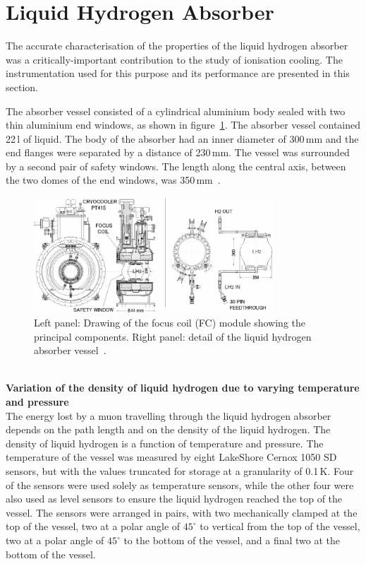 \graphicspath{{07-Absorber/Figures/}}

\section{Liquid Hydrogen Absorber}
\label{Sect:Absorber}

The accurate characterisation of the properties of the liquid hydrogen
absorber was a critically-important contribution to the study of
ionisation cooling.
The instrumentation used for this purpose and its performance are
presented in this section.

The absorber vessel consisted of a cylindrical aluminium body sealed
with two thin aluminium end windows, as shown in
figure~\ref{Fig:AbsorberVessel:Diag}.
The absorber vessel contained 22\,l of liquid.
The body of the absorber had an inner diameter of 300\,mm and the end
flanges were separated by a distance of 230\,mm.
The vessel was surrounded by a second pair of safety
windows.
The length along the central axis, between the
two domes of the end windows, was 350\,mm~\cite{1748-0221-13-09-T09008}.
\begin{figure}
  \begin{center}
    \includegraphics[width=0.80\textwidth]{AFC-drwng-edited.pdf}
  \end{center}
  \caption{
    Left panel: Drawing of the focus coil (FC) module
    showing the principal components.
    Right panel: detail of the liquid hydrogen absorber vessel~\cite{1748-0221-13-09-T09008}.
  }
  \label{Fig:AbsorberVessel:Diag}
\end{figure} \\

\noindent\textbf{Variation of the density of liquid hydrogen due to
    varying temperature and pressure} \\
\noindent
The energy lost by a muon travelling through the liquid hydrogen
absorber depends on the path length and on
the density of the liquid hydrogen. The density of liquid hydrogen is
a function of temperature and pressure.  
The temperature of the vessel was measured by eight LakeShore Cernox
1050 SD sensors, but with the values truncated for storage
at a granularity of 0.1\,K.
Four of the sensors were used solely as temperature sensors, while the
other four were also used as level sensors to ensure the
liquid hydrogen reached the top of the vessel. 
The sensors were arranged in pairs, with two mechanically clamped at
the top of the vessel, two at a polar angle of ${45}^{\circ}$ to
vertical from the top of the vessel, two at a polar angle of
${45}^{\circ}$ to the bottom of the vessel, and a
final two at the bottom of the vessel. 

